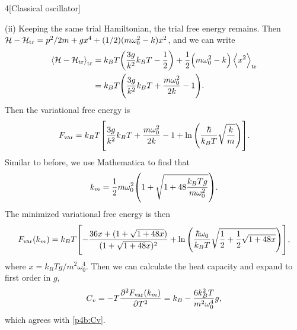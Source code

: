 \documentclass[12pt]{article}
\begin{document}
\begin{problem}{4}[Classical oscillator]
\begin{solution}
(ii) Keeping the same trial Hamiltonian, the trial free energy remains. Then
$\mathcal{H}-\mathcal{H}_{\text{tr}}=p^2/2m+gx^4+(1/2)(m\omega_0^2-k)x^2$, and we can write
\begin{align}
    \expval{\mathcal{H}-\mathcal{H}_{\text{tr}}}_{\text{tr}}
    &=k_BT\qty(\frac{3g}{k^2}k_BT-\frac12)+\frac12\qty(m\omega_0^2-k)\expval{x^2}_{\text{tr}}\notag\\
    &=k_BT\qty(\frac{3g}{k^2}k_BT+\frac{m\omega_0^2}{2k}-1).
\end{align}
Then the variational free energy is
\begin{equation}
    F_{\text{var}}=k_BT\qty[\frac{3g}{k^2}k_BT+\frac{m\omega_0^2}{2k}-1+\ln\qty(\frac{\hbar}{k_BT}\sqrt{\frac{k}{m}})].
\end{equation}
Similar to before, we use Mathematica to find that
\begin{equation}
    k_m=\frac12m\omega_0^2\qty(1+\sqrt{1+48\frac{k_BTg}{m\omega_0^2}}).
\end{equation}
The minimized variational free energy is then
\begin{equation}
    F_{\text{var}}(k_m)=
    k_BT\qty[-\frac{36x+(1+\sqrt{1+48x})}{(1+\sqrt{1+48x})^2}+\ln\qty(\frac{\hbar\omega_0}{k_BT}\sqrt{\frac12+\frac12\sqrt{1+48x}})],
\end{equation}
where $x=k_BTg/m^2\omega_0^4$. Then we can calculate the heat capacity and
expand to first order in $g$,
\begin{equation}
    C_v=-T\frac{\partial^2F_{\text{var}}(k_m)}{\partial T^2}
    =k_B-\frac{6k_B^2T}{m^2\omega_0^4}g,
\end{equation}
which agrees with \eqref{p4b:Cv}.
\end{solution}
\end{problem}
\newpage
\end{document}
